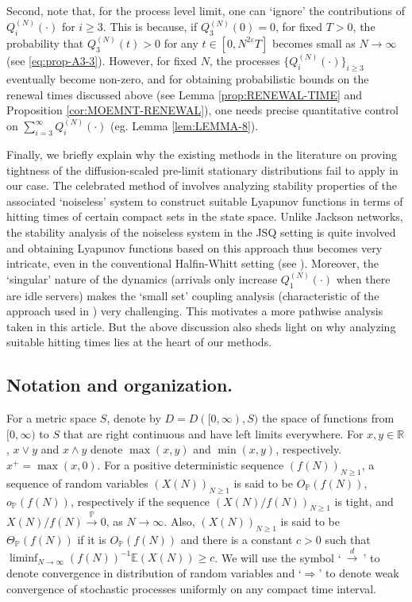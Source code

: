 \documentclass[11pt, reqno]{article}
\numberwithin{equation}{section}
\numberwithin{theorem}{section}
\newcommand\blue[1]{#1}
\def\sss{\scriptscriptstyle}
\newcommand{\PR}{\ensuremath{\mathbb{P}}}
\newcommand{\oP}{o_{\sss \PR}}
\newcommand{\OP}{O_{\sss \PR}}
\newcommand{\ThetaP}{\Theta_{\sss \PR}}
\def\sss{\scriptscriptstyle}
\newcommand{\dto}{\ensuremath{\ \xrightarrow{d} \ }}  %
\newcommand{\R}{\mathbb{R}}                 %
\newcommand{\E}{\mathbb{E}}                 %
\begin{document}
Second, note that, for the process level limit, one can `ignore' the contributions of $Q^{(N)}_i(\cdot)$ for $i \ge 3$. This is because, if $Q^{(N)}_3(0)=0$, for fixed $T>0$, the probability that $Q^{(N)}_3(t)>0$ for any $t \in [0, N^{2\varepsilon}T]$ becomes small as $N \rightarrow \infty$ (see \eqref{eq:prop-A3-3}). However, for fixed $N$, the processes $\{Q^{(N)}_i(\cdot)\}_{i \ge 3}$ eventually become non-zero, and for obtaining probabilistic bounds on the renewal times discussed above (see Lemma \ref{prop:RENEWAL-TIME} and Proposition \ref{cor:MOEMNT-RENEWAL}), one needs precise quantitative control on $\sum_{i=3}^{\infty}Q^{(N)}_i(\cdot)$ (eg. Lemma \ref{lem:LEMMA-8}). 

\blue{Finally, we briefly explain why the existing methods in the literature on proving tightness of the diffusion-scaled pre-limit stationary distributions fail to apply in our case. The celebrated method of \cite{budhiraja2009} involves analyzing stability properties of the associated `noiseless' system to construct suitable Lyapunov functions in terms of hitting times of certain compact sets in the state space. Unlike Jackson networks, the stability analysis of the noiseless system in the JSQ setting is quite involved and obtaining Lyapunov functions based on this approach thus becomes very intricate, even in the conventional Halfin-Whitt setting (see \cite{Anton20}). Moreover, the `singular' nature of the dynamics (arrivals only increase $Q_1^{(N)}(\cdot)$ when there are idle servers) makes the `small set' coupling analysis (characteristic of the \cite{meyn2012} approach used in \cite{budhiraja2009}) very challenging. This motivates a more pathwise analysis taken in this article. But the above discussion also sheds light on why analyzing suitable hitting times lies at the heart of our methods.} 


\subsection{Notation and organization.}\label{notsecn}
For a metric space $S$, 
denote by $D=D([0,\infty),S)$ the space of functions from $[0,\infty)$ to $S$ that are right continuous and have left limits everywhere. 
For $x, y\in \R$, $x\vee y$ and $x\wedge y$ denote $\max(x, y)$ and $\min(x,y)$, respectively.
$x^+ = \max(x, 0)$.
For a positive deterministic sequence $(f(N))_{N\geq 1}$, a sequence of random variables 
$(X(N))_{N\geq 1}$ is said to be $\OP(f(N))$, $\oP(f(N))$, respectively if the sequence $(X(N)/f(N))_{N\geq 1}$
is tight, and $X(N)/f(N)\xrightarrow{\sss\PR} 0$, as $N\to\infty$.
Also, $(X(N))_{N\geq 1}$ is said to be $\ThetaP(f(N))$ if it is $\OP(f(N))$ and there is a constant $c>0$ such that $\liminf_{N\to\infty}(f(N))^{-1}\E(X(N)) \geq c$.
We will use the symbol `$\dto$' to denote convergence in distribution of random variables and `$\Rightarrow$' to denote weak convergence of stochastic processes uniformly on any compact time interval.
\end{document}
